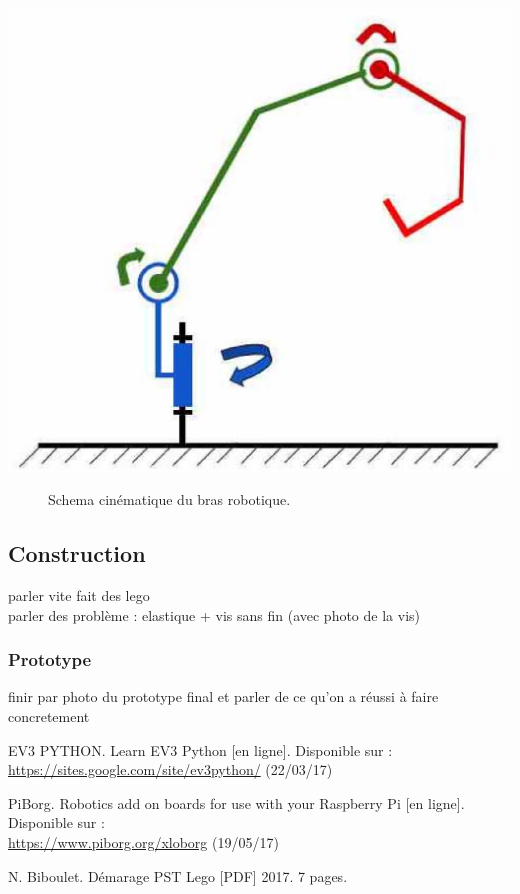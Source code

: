 \documentclass[twoside,twocolumn, 16pt]{article}
\begin{document}
\begin{center}
\includegraphics[scale = 0.3]{cin.eps}
\begin{figure}[!h]
\caption{Schema cinématique du bras robotique.}
\end{figure}
\end{center}

\subsection{Construction}
parler vite fait des lego \\
parler des problème : elastique + vis sans fin (avec photo de la vis)

\subsubsection{Prototype}
finir par photo du prototype final
et parler de ce qu'on a réussi à faire concretement


\begin{thebibliography}{99} %

EV3 PYTHON. Learn EV3 Python [en ligne]. Disponible sur : \\\url{https://sites.google.com/site/ev3python/} (22/03/17)

PiBorg. Robotics add on boards for use with your Raspberry Pi [en ligne]. Disponible sur : \\
\url{https://www.piborg.org/xloborg} (19/05/17)
 
 N. Biboulet. Démarage PST Lego [PDF] 2017. 7 pages.
\end{thebibliography}
\end{document}
